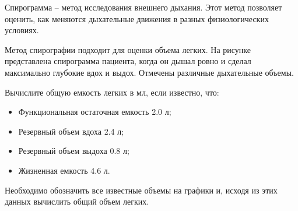 
Спирограмма – метод исследования внешнего дыхания. Этот
метод позволяет оценить, как меняются дыхательные движения в разных
физиологических условиях. 

Метод спирографии подходит для
оценки объема легких. На рисунке представлена спирограмма пациента, когда он
дышал ровно и сделал максимально глубокие вдох и выдох. Отмечены различные
дыхательные объемы.


Вычислите общую емкость легких в мл, если известно, что:

\begin{itemize}
    \item Функциональная остаточная емкость 2.0 л;
    \item Резервный объем вдоха 2.4 л;
    \item Резервный объем выдоха 0.8 л;
    \item Жизненная емкость 4.6 л.
\end{itemize}

\explanationSection

Необходимо обозначить все известные объемы на графики и, исходя из этих данных вычислить общий объем легких.


